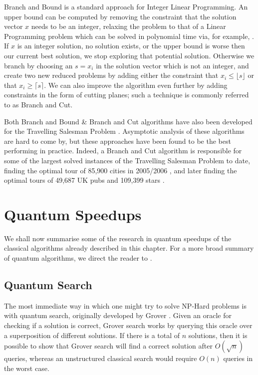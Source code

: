 Branch and Bound is a standard approach for Integer Linear Programming. An upper bound can be computed by removing the constraint that the solution vector $x$ needs to be an integer, relaxing the problem to that of a Linear Programming problem which can be solved in polynomial time via, for example, \cite{cohen2019}. If $x$ is an integer solution, no solution exists, or the upper bound is worse then our current best solution, we stop exploring that potential solution. Otherwise we branch by choosing an $s = x_i$ in the solution vector which is not an integer, and create two new reduced problems by adding either the constraint that $x_i \leq \lfloor s \rfloor$ or that $x_i \geq \lceil s \rceil$. We can also improve the algorithm even further by adding constraints in the form of cutting planes; such a technique is commonly referred to as Branch and Cut.

Both Branch and Bound \& Branch and Cut algorithms have also been developed for the Travelling Salesman Problem \cite{little1963, padberg1991}. Asymptotic analysis of these algorithms are hard to come by, but these approaches have been found to be the best performing in practice. Indeed, a Branch and Cut algorithm is responsible for some of the largest solved instances of the Travelling Salesman Problem to date, finding the optimal tour of 85,900 cities in 2005/2006 \cite{applegate2006}, and later finding the optimal tours of 49,687 UK pubs and 109,399 stars \cite{tspuk49687}.

\section{Quantum Speedups}
\label{sec:quantum-np}

We shall now summarise some of the research in quantum speedups of the classical algorithms already described in this chapter. For a more broad summary of quantum algorithms, we direct the reader to \cite{montanaro2016}.

\subsection{Quantum Search}

The most immediate way in which one might try to solve NP-Hard problems is with quantum search, originally developed by Grover \cite{grover96}. Given an oracle for checking if a solution is correct, Grover search works by querying this oracle over a superposition of different solutions. If there is a total of $n$ solutions, then it is possible to show that Grover search will find a correct solution after $O(\sqrt{n})$ queries, whereas an unstructured classical search would require $O(n)$ queries in the worst case.

